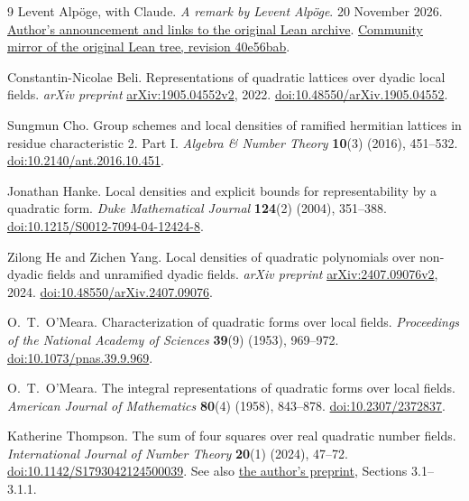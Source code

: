 \documentclass[12pt,letterpaper]{article}
\begin{document}
\clearpage
\begingroup\small
\begin{thebibliography}{9}
Levent Alp\"oge, with Claude. \emph{A remark by Levent Alp\"oge}. 20 November 2026.
\href{https://alpo.ge/remark.pdf}{Author's announcement and links to the original Lean archive}.
\href{https://github.com/leanprover-community/riemann-hypothesis/tree/40e56bab026552e089d7afcfeff08d2defb9c005}{Community mirror of the original Lean tree, revision 40e56bab}.

Constantin-Nicolae Beli. Representations of quadratic lattices over dyadic local fields.
\emph{arXiv preprint} \href{https://arxiv.org/abs/1905.04552v2}{arXiv:1905.04552v2}, 2022.
\href{https://doi.org/10.48550/arXiv.1905.04552}{doi:10.48550/arXiv.1905.04552}.

Sungmun Cho. Group schemes and local densities of ramified hermitian lattices in residue characteristic 2. Part I.
\emph{Algebra \& Number Theory} \textbf{10}(3) (2016), 451--532.
\href{https://doi.org/10.2140/ant.2016.10.451}{doi:10.2140/ant.2016.10.451}.

Jonathan Hanke. Local densities and explicit bounds for representability by a quadratic form.
\emph{Duke Mathematical Journal} \textbf{124}(2) (2004), 351--388.
\href{https://doi.org/10.1215/S0012-7094-04-12424-8}{doi:10.1215/S0012-7094-04-12424-8}.

Zilong He and Zichen Yang. Local densities of quadratic polynomials over non-dyadic fields and unramified dyadic fields.
\emph{arXiv preprint} \href{https://arxiv.org/abs/2407.09076v2}{arXiv:2407.09076v2}, 2024.
\href{https://doi.org/10.48550/arXiv.2407.09076}{doi:10.48550/arXiv.2407.09076}.

O.\ T.\ O'Meara. Characterization of quadratic forms over local fields.
\emph{Proceedings of the National Academy of Sciences} \textbf{39}(9) (1953), 969--972.
\href{https://doi.org/10.1073/pnas.39.9.969}{doi:10.1073/pnas.39.9.969}.

O.\ T.\ O'Meara. The integral representations of quadratic forms over local fields.
\emph{American Journal of Mathematics} \textbf{80}(4) (1958), 843--878.
\href{https://doi.org/10.2307/2372837}{doi:10.2307/2372837}.

Katherine Thompson. The sum of four squares over real quadratic number fields.
\emph{International Journal of Number Theory} \textbf{20}(1) (2024), 47--72.
\href{https://doi.org/10.1142/S1793042124500039}{doi:10.1142/S1793042124500039}.
See also \href{https://arxiv.org/pdf/1610.06935v2}{the author's preprint}, Sections 3.1--3.1.1.
\end{thebibliography}
\endgroup
\end{document}
